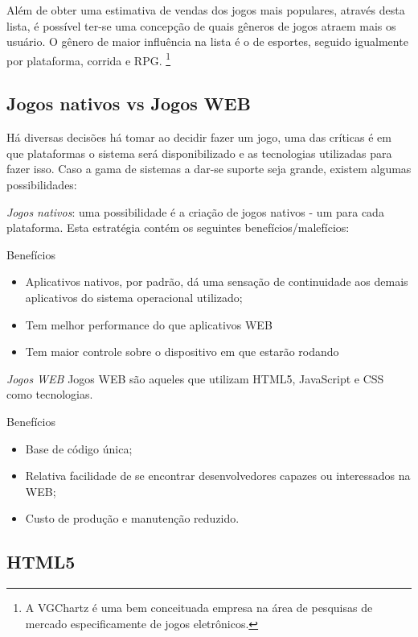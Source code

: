 \documentclass{article}
\begin{document}
Além de obter uma estimativa de vendas dos jogos mais populares, através desta lista, é possível ter-se uma concepção de quais gêneros de jogos atraem mais os usuário. O gênero de maior influência na lista é o de esportes, seguido igualmente por plataforma, corrida e RPG.
\footnote{A VGChartz é uma bem conceituada   empresa na área de pesquisas de mercado especificamente de jogos eletrônicos.}


\subsection{Jogos nativos vs Jogos WEB}

Há diversas decisões há tomar ao decidir fazer um jogo, uma das críticas é em que plataformas o sistema será disponibilizado e as tecnologias utilizadas para fazer isso. Caso a gama de sistemas a dar-se suporte seja grande, existem algumas possibilidades: 

\emph{Jogos nativos}: uma possibilidade é a criação de jogos nativos - um para cada plataforma. Esta estratégia contém os seguintes benefícios/malefícios: 

Benefícios
\begin{itemize}
    \item  Aplicativos nativos, por padrão, dá uma sensação de continuidade aos demais aplicativos do sistema operacional utilizado;
    \item Tem melhor performance do que aplicativos WEB
    \item Tem maior controle sobre o dispositivo em que estarão rodando
\end{itemize}


\emph{Jogos WEB}
Jogos WEB são aqueles que utilizam HTML5, JavaScript e CSS como tecnologias. 

Benefícios
\begin{itemize}
    \item Base de código única;
    \item  Relativa facilidade de se encontrar desenvolvedores capazes ou interessados na WEB;
    \item Custo de produção e manutenção reduzido.
\end{itemize}

\subsection{HTML5}
\end{document}
